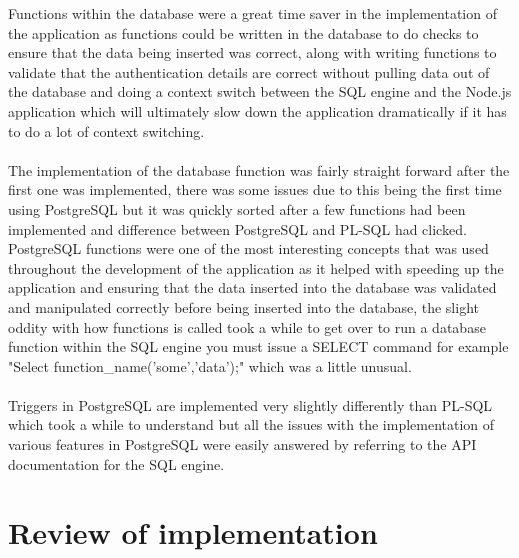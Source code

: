 Functions within the database were a great time saver in the implementation of the application as functions could be written in the database to do checks to ensure that the data being inserted was correct, along with writing functions to validate that the authentication details are correct without pulling data out of the database and doing a context switch between the SQL engine and the Node.js application which will ultimately slow down the application dramatically if it has to do a lot of context switching.\\
\\
The implementation of the database function was fairly straight forward after the first one was implemented, there was some issues due to this being the first time using PostgreSQL but it was quickly sorted after a few functions had been implemented and difference between PostgreSQL and PL-SQL had clicked. PostgreSQL functions were one of the most interesting concepts that was used throughout the development of the application as it helped with speeding up the application and ensuring that the data inserted into the database was validated and manipulated correctly before being inserted into the database, the slight oddity with how functions is called took a while to get over to run a database function within the SQL engine you must issue a SELECT command for example "Select function_name('some','data');" which was a little unusual.\\
\\
Triggers in PostgreSQL are implemented very slightly differently than PL-SQL which took a while to understand but all the issues with the implementation of various features in PostgreSQL were easily answered by referring to the API documentation \cite{Postgres:APIDocumentation:2015:online} for the SQL engine.

\section{Review of implementation}

